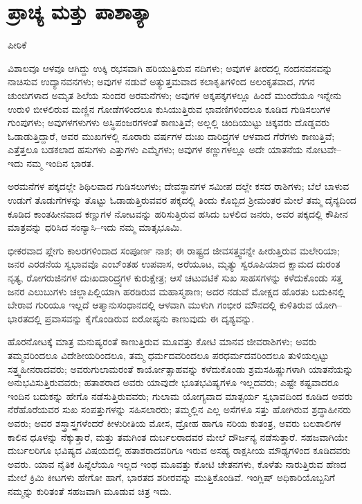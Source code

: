 
\chapter{ಪ್ರಾಚ್ಯ ಮತ್ತು ಪಾಶಾತ್ಯಾ}

\begin{center}
ಪೀಠಿಕೆ
\end{center}

ವಿಶಾಲವೂ ಆಳವೂ ಆಗಿದ್ದು ಉಕ್ಕಿ ರಭಸವಾಗಿ ಹರಿಯುತ್ತಿರುವ ನದಿಗಳು; ಅವುಗಳ ತೀರದಲ್ಲಿ ನಂದನವನವನ್ನು ನಾಚಿಸುವ ಉದ್ಯಾನವನಗಳು; ಅವುಗಳ ನಡುವೆ ಅತ್ಯುತ್ತಮವಾದ ಕಲಾಕೃತಿಗಳಿಂದ ಅಲಂಕೃತವಾದ, ಗಗನ ಚುಂಬಿಗಳಾದ ಅಮೃತ ಶಿಲೆಯ ಸುಂದರ ಅರಮನೆಗಳು; ಅವುಗಳ ಅಕ್ಕಪಕ್ಕಗಳಲ್ಲೂ ಹಿಂದೆ ಮುಂದೆಯೂ ಇನ್ನೇನು ಉರುಳಿ ಬೀಳಲಿರುವ ಮಣ್ಣಿನ ಗೋಡೆಗಳಿಂದಲೂ ಕುಸಿಯುತ್ತಿರುವ ಛಾವಣಿಗಳಿಂದಲೂ ಕೂಡಿದ ಗುಡಿಸಲುಗಳ ಗುಂಪುಗಳು; ಅವುಗಳಗಳುಗಳು ಅಸ್ಥಿಪಂಜರಗಳಂತೆ ಕಾಣುತ್ತಿವೆ; ಅಲ್ಲಲ್ಲಿ ಚಿಂದಿಯುಟ್ಟು ಚಿಕ್ಕವರು ದೊಡ್ಡವರು ಓಡಾಡುತ್ತಿದ್ದಾರೆ, ಅವರ ಮುಖಗಳಲ್ಲಿ ನೂರಾರು ವರ್ಷಗಳ ದುಃಖ ದಾರಿದ್ರ್ಯಗಳ ಆಳವಾದ ಗೆರೆಗಳು ಕಾಣುತ್ತಿವೆ; ಎತ್ತೆತ್ತಲೂ ಬಡಕಲಾದ ಹಸುಗಳು ಎತ್ತುಗಳು ಎಮ್ಮೆಗಳು; ಅವುಗಳ ಕಣ್ಣುಗಳಲ್ಲೂ ಅದೇ ಯಾತನೆಯ ನೋಟವೇ– ಇದು ನಮ್ಮ ಇಂದಿನ ಭಾರತ.

ಅರಮನೆಗಳ ಪಕ್ಕದಲ್ಲೇ ಶಿಥಿಲವಾದ ಗುಡಿಸಲುಗಳು; ದೇವಸ್ಥಾನಗಳ ಸಮೀಪ ದಲ್ಲೇ ಕಸದ ರಾಶಿಗಳು; ಬೆಲೆ ಬಾಳುವ ಉಡುಗೆ ತೊಡುಗೆಗಳನ್ನು ತೊಟ್ಟು ಓಡಾಡುತ್ತಿರುವವರ ಪಕ್ಕದಲ್ಲಿ ತಿಂದು ಕೊಬ್ಬಿದ ಶ‍್ರೀಮಂತರ ಮೇಲೆ ತಮ್ಮ ದೈನ್ಯದಿಂದ ಕೂಡಿದ ಕಾಂತಹೀನವಾದ ಕಣ್ಣುಗಳ ನೋಟವನ್ನು ಹರಿಸುತ್ತಿರುವ ಹಸಿದು ಬಳಲಿದ ಜನರು, ಅವರ ಪಕ್ಕದಲ್ಲಿ ಕೌಪೀನ ಮಾತ್ರವನ್ನು ಧರಿಸಿದ ಸಂನ್ಯಾಸಿ–ಇದು ನಮ್ಮ ಮಾತೃಭೂಮಿ.

ಭೀಕರವಾದ ಪ್ಲೇಗು ಕಾಲರಗಳಿಂದಾದ ಸಂಪೂರ್ಣ ನಾಶ; ಈ ರಾಷ್ಟ್ರದ ಜೀವಸತ್ತ್ವ\break ವನ್ನೇ ಹೀರುತ್ತಿರುವ ಮಲೇರಿಯಾ; ಜನರ ಎರಡನೆಯ ಸ್ವಭಾವವೊ ಎಂಬ್ಂತಹ ಉಪವಾಸ, ಅರೆಯೂಟ, ಮೃತ್ಯು ಸ್ವರೂಪಿಯಾದ ಕ್ಷಾಮದ ದುರಂತ ನೃತ್ಯ, ರೋಗರುಜಿನಗಳ ದುಃಖದಾರಿದ್ರ್ಯಗಳ ಕುರುಕ್ಷೇತ್ರ; ಆಸೆ ಚಟುವಟಿಕೆ ಸುಖ ಸಾಹಸಗಳನ್ನು ಕಳೆದುಕೊಂಡು ಸತ್ತ ಜನರ ಎಲುಬುಗಳು ಚಲ್ಲಾಪಿಲ್ಲಿಯಾಗಿ ಹರಡಿರುವ ಮಹಾಸ್ಮಶಾಣ; ಅದರ ನಡುವೆ ಮೋಕ್ಷದ ಹೊರತು ಬದುಕಿನಲ್ಲಿ ಬೇರಾವ ಗುರಿಯೂ ಇಲ್ಲದೆ ಆತ್ಮಾನುಸಂಧಾನದಲ್ಲಿ ಆಳವಾಗಿ ಮುಳುಗಿ ಗಂಭೀರ ಮೌನದಲ್ಲಿ ಕುಳಿತಿರುವ ಯೋಗಿ– ಭಾರತದಲ್ಲಿ ಪ್ರವಾಸವನ್ನು ಕೈಗೊಂಡಿರುವ ಐರೋಪ್ಯನು ಕಾಣುವುದು ಈ ದೃಶ್ಯವನ್ನು.

ಹೊರನೋಟಕ್ಕೆ ಮಾತ್ರ ಮನುಷ್ಯರಂತೆ ಕಾಣುತ್ತಿರುವ ಮೂವತ್ತು ಕೋಟಿ ಮಾನವ ಜೀವರಾಶಿಗಳು; ಅವರು ತಮ್ಮವರಿಂದಲೂ ವಿದೇಶೀಯರಿಂದಲೂ, ತಮ್ಮ ಧರ್ಮದವರಿಂದಲೂ ಪರಧರ್ಮದವರಿಂದಲೂ ತುಳಿಯಲ್ಪಟ್ಟು ಸತ್ತ್ವಹೀನರಾದವರು; ಅವರು\break ಗುಲಾಮರಂತೆ ಕಾರ್ಯೋತ್ಸಾಹವನ್ನು ಕಳೆದುಕೊಂಡು ಶ್ರಮಸಹಿಷ್ಣುಗಳಾಗಿ ಯಾತನೆಯನ್ನು ಅನುಭವಿಸುತ್ತಿರುವವರು; ಹತಾಶರಾದ ಅವರು ಯಾವುದೇ ಭೂತಭವಿಷ್ಯಗಳೂ ಇಲ್ಲದವರು; ಎಷ್ಟೇ ಕಷ್ಟವಾದರೂ ಇಂದಿನ ಬದುಕನ್ನು ಹೇಗೊ ನಡೆಸುತ್ತಿರುವವರು; ಗುಲಾಮ ಯೋಗ್ಯವಾದ ಮಾತ್ಸರ್ಯ ಸ್ವಭಾವದಿಂದ ಕೂಡಿದ ಅವರು ನೆರೆಹೊರೆಯವರ ಸುಖ ಸಂಪತ್ತುಗಳನ್ನು ಸಹಿಸಲಾರರು; ತಮ್ಮಲ್ಲಿನ ಎಲ್ಲ ಅಸೆಗಳೂ ಸತ್ತು ಹೋಗಿರುವ ಶ್ರದ್ಧಾಹೀನರು ಅವರು; ಅವರ ಶಸ್ತ್ರಾಸ್ತ್ರಗಳೆಂದರೆ ಕೀಳುರೀತಿಯ ಮೋಸ, ದ್ರೋಹ ಹಾಗೂ ನರಿಯ ಕುತಂತ್ರ, ಅವರು ಬಲಶಾಲಿಗಳ ಕಾಲಿನ ಧೂಳನ್ನು ನೆಕ್ಕುತ್ತಾರೆ, ಮತ್ತು ತಮಗಿಂತ ದುರ್ಬಲರಾದವರ ಮೇಲೆ ದೌರ್ಜನ್ಯ ನಡೆಸುತ್ತಾರೆ. ಸಹಜವಾಗಿಯೇ ದುರ್ಬಲರಿಗೂ ಭವಿಷ್ಯದ ವಿಷಯದಲ್ಲಿ ಹತಾಶರಾದವರಿಗೂ ಇರುವ ಅಸಹ್ಯ ರಾಕ್ಷಸೀಯ ಮೌಢ್ಯಗಳಿಂದ ಕೂಡಿದವರು ಅವರು. ಯಾವ ನೈತಿಕ ಹಿನ್ನೆಲೆಯೂ ಇಲ್ಲದ ಇಂಥ ಮೂವತ್ತು ಕೋಟಿ ಚೇತನಗಳು, ಕೊಳೆತು ನಾರುತ್ತಿರುವ ಹೆಣದ ಮೇಲೆ ಕ್ರಿಮಿ ಕೀಟಗಳು ಹೇಗೋ ಹಾಗೆ, ಭಾರತದ ಶರೀರವನ್ನು ಮುತ್ತಿಕೊಂಡಿವೆ. ಇಂಗ್ಲಿಷ್​ ಅಧಿಕಾರಿಯೊಬ್ಬನಿಗೆ ನಮ್ಮನ್ನು ಕುರಿತಂತೆ ಸಹಜವಾಗಿ ಮೂಡುವ ಚಿತ್ರ ಇದು.

